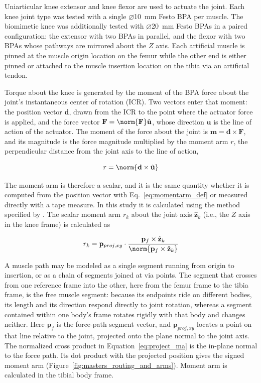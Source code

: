 Uniarticular knee extensor and knee flexor are used to actuate the joint. Each knee joint type was tested with a single $\diameter$\qty{10}{\mm} Festo BPA per muscle. The biomimetic knee was additionally tested with $\diameter$\qty{20}{\mm} Festo BPAs in a paired configuration: the extensor with two BPAs in parallel, and the flexor with two BPAs whose pathways are mirrored about the $Z$ axis. Each artificial muscle is pinned at the muscle origin location on the femur while the other end is either pinned or attached to the muscle insertion location on the tibia via an artificial tendon.

Torque about the knee is generated by the moment of the BPA force about the joint's instantaneous center of rotation (ICR). Two vectors enter that moment: the position vector $\mathbf{d}$, drawn from the ICR to the point where the actuator force is applied, and the force vector $\mathbf{F} = \norm{\mathbf{F}}\hat{\mathbf{u}}$, whose direction $\hat{\mathbf{u}}$ is the line of action of the actuator. The moment of the force about the joint is $\mathbf{m} = \mathbf{d} \times \mathbf{F}$, and its magnitude is the force magnitude multiplied by the moment arm $r$, the perpendicular distance from the joint axis to the line of action,

\begin{equation}
    r = \norm{\mathbf{d} \times \hat{\mathbf{u}}}
    \label{eq:momentarm_def}
\end{equation}

The moment arm is therefore a scalar, and it is the same quantity whether it is computed from the position vector with Eq.~\eqref{eq:momentarm_def} or measured directly with a tape measure. In this study it is calculated using the method specified by \citet{young_analyzing_2019}. The scalar moment arm $r_{k}$ about the joint axis $\hat{\mathbf{z}}_{k}$ (i.e., the $Z$ axis in the knee frame) is calculated as 

\begin{equation}
    r_{k} = \mathbf{p}_{proj,xy} \cdot \frac{\mathbf{p}_{f} \times \hat{\mathbf{z}}_{k}} { \norm{\mathbf{p}_{f} \times \hat{\mathbf{z}}_{k}} } \label{eq:project_ma}
\end{equation}

A muscle path may be modeled as a single segment running from origin to insertion, or as a chain of segments joined at via points. The segment that crosses from one reference frame into the other, here from the femur frame to the tibia frame, is the free muscle segment: because its endpoints ride on different bodies, its length and its direction respond directly to joint rotation, whereas a segment contained within one body's frame rotates rigidly with that body and changes neither. Here $\mathbf{p}_{f}$ is the force-path segment vector, and $\mathbf{p}_{proj,xy}$ locates a point on that line relative to the joint, projected onto the plane normal to the joint axis. The normalized cross product in Equation~\eqref{eq:project_ma} is the in-plane normal to the force path. Its dot product with the projected position gives the signed moment arm (Figure~\ref{fig:masters_routing_and_arms}). Moment arm is calculated in the tibial body frame.

